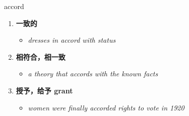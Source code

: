 
\begin{frame}
{\huge accord}
\begin{center}
\begin{enumerate}\Large
  \item \textbf{一致的}
  \begin{itemize}
    \item \em{\Large{dresses in accord with status}}
  \end{itemize}
  \item \textbf{相符合，相一致}
  \begin{itemize}
    \item \em{\Large{a theory that accords with the known facts}}
  \end{itemize}
  \item \textbf{授予，给予 grant}
  \begin{itemize}
    \item \em{\Large{women were finally accorded rights to vote in 1920}}
  \end{itemize}
\end{enumerate}
\end{center}
\end{frame}
